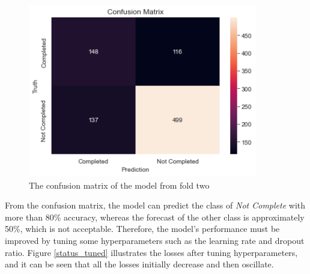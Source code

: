 \documentclass[12pt,twoside]{report}
\begin{document}
\begin{figure}[!htbp]
	\centering
	\includegraphics[width=10cm]{cm_dropout2}
	\caption{The confusion matrix of the model from fold two}
	\label{status_dropout_prediction}
\end{figure}

From the confusion matrix, the model can predict the class of \textit{Not Complete} with more than 80\% accuracy, whereas the forecast of the other class is approximately 50\%, which is not acceptable. Therefore, the model's performance must be improved by tuning some hyperparameters such as the learning rate and dropout ratio. Figure \ref{status_tuned} illustrates the losses after tuning hyperparameters, and it can be seen that all the losses initially decrease and then oscillate. 
\\
\end{document}
